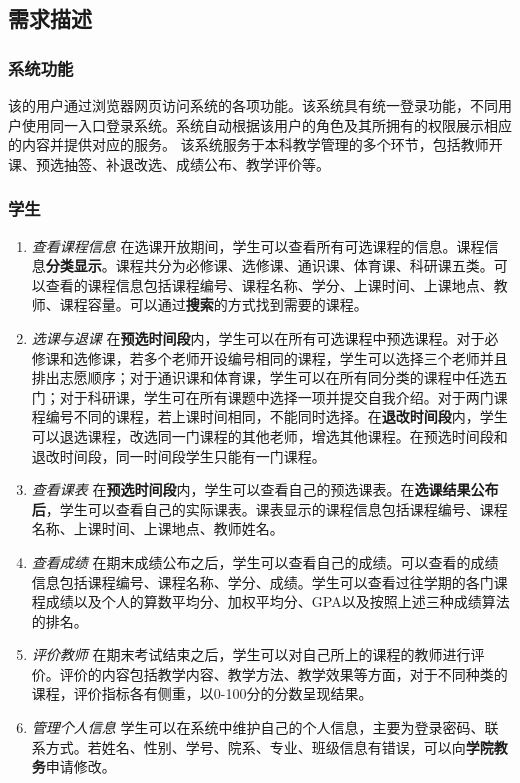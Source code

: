 \subsection{需求描述}

\subsubsection{系统功能}
\ttfamily
该的用户通过浏览器{\sffamily 网页}访问系统的各项功能。该系统具有{\sffamily 统一登录}功能，不同用户使用同一入口登录系统。系统自动根据该用户的角色及其所拥有的权限展示相应的内容并提供对应的服务。
该系统服务于本科教学管理的多个环节，包括教师开课、预选抽签、补退改选、成绩公布、教学评价等。

\normalfont

\subsubsection{学生}
\begin{enumerate}
    \item \textit{查看课程信息} \quad 在选课开放期间，学生可以查看所有可选课程的信息。课程信息\textbf{分类显示}。课程共分为必修课、选修课、通识课、体育课、科研课五类。可以查看的课程信息包括课程编号、课程名称、学分、上课时间、上课地点、教师、课程容量。可以通过\textbf{搜索}的方式找到需要的课程。
    \item \textit{选课与退课} \quad 在\textbf{预选时间段}内，学生可以在所有可选课程中预选课程。对于必修课和选修课，若多个老师开设编号相同的课程，学生可以选择三个老师并且排出志愿顺序；对于通识课和体育课，学生可以在所有同分类的课程中任选五门；对于科研课，学生可在所有课题中选择一项并提交自我介绍。对于两门课程编号不同的课程，若上课时间相同，不能同时选择。在\textbf{退改时间段}内，学生可以退选课程，改选同一门课程的其他老师，增选其他课程。在预选时间段和退改时间段，同一时间段学生只能有一门课程。
    \item \textit{查看课表} \quad 在\textbf{预选时间段}内，学生可以查看自己的预选课表。在\textbf{选课结果公布后}，学生可以查看自己的实际课表。课表显示的课程信息包括课程编号、课程名称、上课时间、上课地点、教师姓名。
    \item \textit{查看成绩} \quad 在期末成绩公布之后，学生可以查看自己的成绩。可以查看的成绩信息包括课程编号、课程名称、学分、成绩。学生可以查看过往学期的各门课程成绩以及个人的算数平均分、加权平均分、GPA以及按照上述三种成绩算法的排名。
    \item \textit{评价教师} \quad 在期末考试结束之后，学生可以对自己所上的课程的教师进行评价。评价的内容包括教学内容、教学方法、教学效果等方面，对于不同种类的课程，评价指标各有侧重，以0-100分的分数呈现结果。
    \item \textit{管理个人信息} \quad 学生可以在系统中维护自己的个人信息，主要为登录密码、联系方式。若姓名、性别、学号、院系、专业、班级信息有错误，可以向\textbf{学院教务}申请修改。
\end{enumerate}

